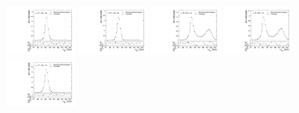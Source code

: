 \begin{figure}[htbp]
  \centering
  \includegraphics[width=0.2\textwidth]{fig/2Dfit/templateVsReco_res_r0_MJ_mu_HP_nobb_LDy.pdf}
  \includegraphics[width=0.2\textwidth]{fig/2Dfit/templateVsReco_res_r0_MJ_e_HP_nobb_LDy.pdf}
  \includegraphics[width=0.2\textwidth]{fig/2Dfit/templateVsReco_res_r0_MJ_mu_LP_nobb_LDy.pdf}
  \includegraphics[width=0.2\textwidth]{fig/2Dfit/templateVsReco_res_r0_MJ_e_LP_nobb_LDy.pdf}\\
  \includegraphics[width=0.2\textwidth]{fig/2Dfit/templateVsReco_res_r0_MJ_mu_HP_nobb_HDy.pdf}

\end{figure}
